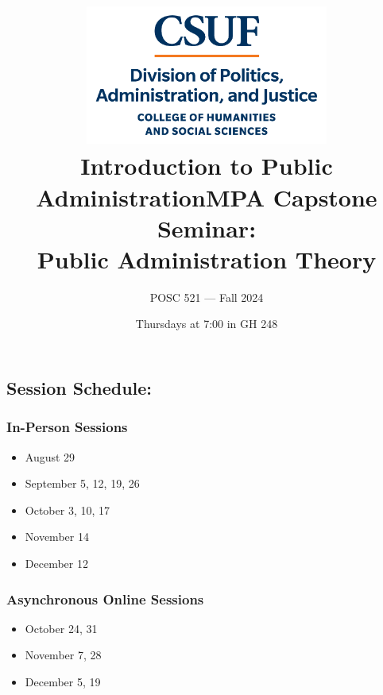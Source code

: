 \documentclass[12pt, letterpaper]{article}
\begin{document}
\title{\includegraphics[width=8cm]{Images/stacked.png} \\ \textbf{Introduction to Public Administration}}

\title{MPA Capstone Seminar: \\ Public Administration Theory}
\author{POSC 521 — Fall 2024}
\date{Thursdays at 7:00 in GH 248}
    \maketitle
    \subsection*{Session Schedule:}
    
    \begin{multicols}{2}
    \subsubsection*{In-Person Sessions}
    \begin{itemize}[leftmargin=*]
      \item August 29
      \item September 5, 12, 19, 26
      \item October 3, 10, 17
      \item November 14
      \item December 12
    \end{itemize}
    
    \columnbreak
    
    \subsubsection*{Asynchronous Online Sessions}
    \begin{itemize}[leftmargin=*]
      \item October 24, 31
      \item November 7, 28
      \item December 5, 19
    \end{itemize}
    \end{multicols}
\end{document}
